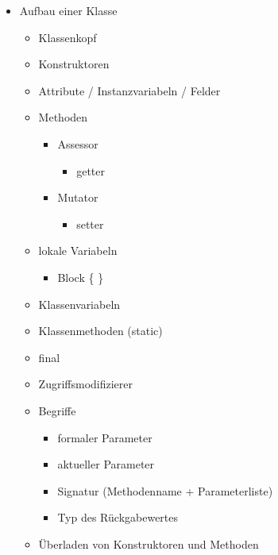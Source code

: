 \begin{itemize}
    \item Aufbau einer Klasse
    \begin{itemize}
        \item Klassenkopf
        \item Konstruktoren
        \item Attribute / Instanzvariabeln / Felder
        \item Methoden
        \begin{itemize}
            \item Assessor
            \begin{itemize}
                \item getter
            \end{itemize}
            \item Mutator
            \begin{itemize}
                \item setter
            \end{itemize}
        \end{itemize}
        \item lokale Variabeln
        \begin{itemize}
            \item Block \{ \}
        \end{itemize}
        \item Klassenvariabeln
        \item Klassenmethoden (static)
        \item final
        \item Zugriffsmodifizierer
        \item Begriffe
        \begin{itemize}
            \item formaler Parameter
            \item aktueller Parameter
            \item Signatur (Methodenname + Parameterliste)
            \item Typ des  Rückgabewertes
        \end{itemize}
        \item Überladen von Konstruktoren und Methoden
    \end{itemize}
\end{itemize}
